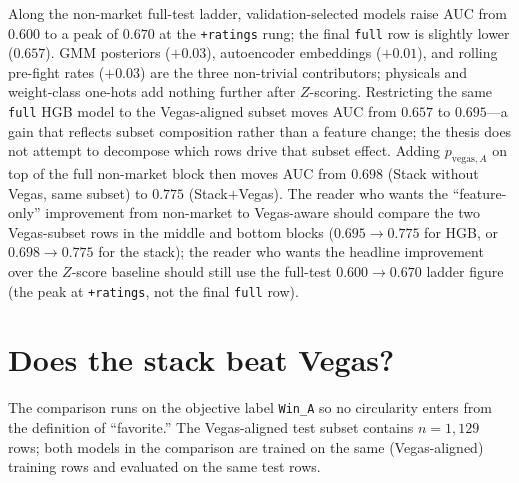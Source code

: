 \documentclass[12pt,oneside]{report}
\begin{document}
Along the non-market full-test ladder, validation-selected models raise AUC from
$0.600$ to a peak of $0.670$ at the \texttt{+ratings} rung; the final \texttt{full} row is slightly lower ($0.657$).
GMM posteriors ($+0.03$), autoencoder embeddings ($+0.01$), and rolling
pre-fight rates ($+0.03$) are the three non-trivial contributors;
physicals and weight-class one-hots add nothing further after
$Z$-scoring.  Restricting the same \texttt{full} HGB model to the
Vegas-aligned subset moves AUC from $0.657$ to $0.695$---a gain that
reflects subset composition rather than a feature change; the thesis does not attempt to decompose which rows drive that subset effect.  Adding \(p_{\mathrm{vegas},A}\) on top of the full
non-market block then moves AUC from $0.698$ (Stack without Vegas,
same subset) to $0.775$ (Stack$+$Vegas).  The reader who wants the
``feature-only'' improvement from non-market to Vegas-aware should
compare the two Vegas-subset rows in the middle and bottom blocks
($0.695\!\to\!0.775$ for HGB, or $0.698\!\to\!0.775$ for the
stack); the reader who wants the headline improvement over the
$Z$-score baseline should still use the full-test
$0.600\!\to\!0.670$ ladder figure (the peak at \texttt{+ratings}, not the final \texttt{full} row).

\section{Does the stack beat Vegas?}\label{sec:vegas-compare}

The comparison runs on the objective label \texttt{Win\_A} so no
circularity enters from the definition of ``favorite.''  The
Vegas-aligned test subset contains \(n = 1{,}129\) rows; both
models in the comparison are trained on the same (Vegas-aligned)
training rows and evaluated on the same test rows.
\end{document}
